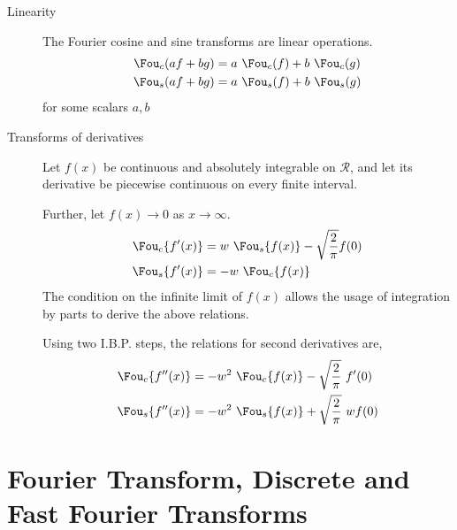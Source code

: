 \begin{description}
    \item[Linearity] The Fourier cosine and sine transforms are linear operations.
        \begin{align}
            \Fou_c(af + bg) & = a\ \Fou_c(f) + b\ \Fou_c(g) \\
            \Fou_s(af + bg) & = a\ \Fou_s(f) + b\ \Fou_s(g)
        \end{align}
        for some scalars $ a, b $

    \item[Transforms of derivatives] Let $ f(x) $ be continuous and absolutely integrable
        on $ \mathcal{R} $, and let its derivative be piecewise continuous on every
        finite interval. \par
        Further, let $ f(x) \to 0 $ as $ x \to \infty $.
        \begin{align}
            \Fou_c \{f'(x)\} & = w\ \Fou_s \{f(x)\} - \sqrt{\frac{2}{\pi}} f(0) \\
            \Fou_s \{f'(x)\} & = -w\ \Fou_c \{f(x)\}
        \end{align}
        The condition on the infinite limit of $ f(x) $ allows the usage of integration
        by parts to derive the above relations. \par
        Using two I.B.P. steps, the relations for second derivatives are,
        \begin{align}
            \Fou_c \{f''(x)\} & = -w^2\ \Fou_c \{f(x)\} - \sqrt{\frac{2}{\pi}}\ f'(0) \\
            \Fou_s \{f''(x)\} & = -w^2\ \Fou_s \{f(x)\} + \sqrt{\frac{2}{\pi}}\ wf(0)
        \end{align}
\end{description}

\section{Fourier Transform, Discrete and Fast Fourier Transforms}


